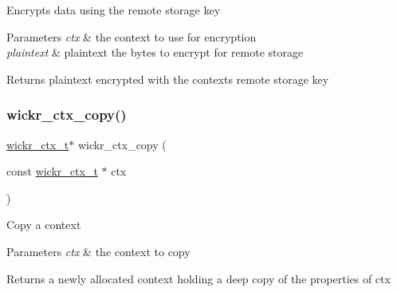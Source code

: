 Encrypts data using the remote storage key


\begin{DoxyParams}{Parameters}
{\em ctx} & the context to use for encryption \\
\hline
{\em plaintext} & plaintext the bytes to encrypt for remote storage \\
\hline
\end{DoxyParams}
\begin{DoxyReturn}{Returns}
\textquotesingle{}plaintext\textquotesingle{} encrypted with the context\textquotesingle{}s remote storage key 
\end{DoxyReturn}
\mbox{\label{group__wickr__ctx_gaaa74a32619fb3b382fbeeeddc425a910}} 
\subsubsection{\texorpdfstring{wickr\_ctx\_copy()}{wickr\_ctx\_copy()}}
{\footnotesize\ttfamily \mbox{\hyperlink{structwickr__ctx}{wickr\+\_\+ctx\+\_\+t}}$\ast$ wickr\+\_\+ctx\+\_\+copy (\begin{DoxyParamCaption}\item[{const \mbox{\hyperlink{structwickr__ctx}{wickr\+\_\+ctx\+\_\+t}} $\ast$}]{ctx }\end{DoxyParamCaption})}

Copy a context


\begin{DoxyParams}{Parameters}
{\em ctx} & the context to copy \\
\hline
\end{DoxyParams}
\begin{DoxyReturn}{Returns}
a newly allocated context holding a deep copy of the properties of \textquotesingle{}ctx\textquotesingle{} 
\end{DoxyReturn}
\mbox{\label{group__wickr__ctx_ga085975d71519bf5729a7cf264a5f7876}} 
